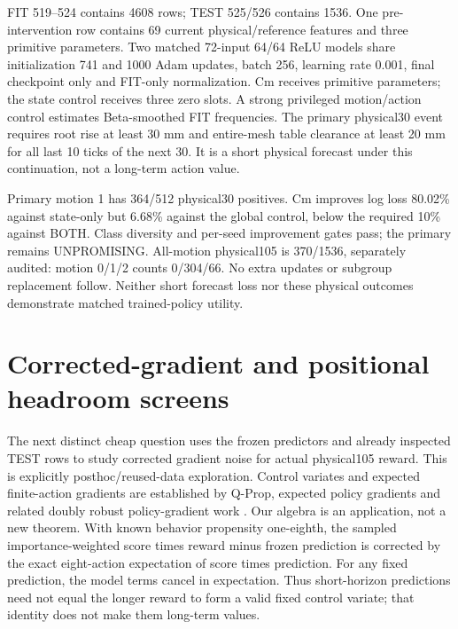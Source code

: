 \documentclass[10pt]{article}
\begin{document}
FIT 519--524 contains 4608 rows; TEST 525/526 contains 1536. One pre-intervention row
contains 69 current physical/reference features and three primitive parameters.
Two matched 72-input 64/64 ReLU models share initialization 741 and 1000 Adam updates,
batch 256, learning rate 0.001, final checkpoint only and FIT-only normalization.
Cm receives primitive parameters; the state control receives three zero slots.
A strong privileged motion/action control estimates Beta-smoothed FIT frequencies.
The primary physical30 event requires root rise at least 30 mm and entire-mesh
table clearance at least 20 mm for all last 10 ticks of the next 30. It is a short
physical forecast under this continuation, not a long-term action value.

\begin{table}[h]
\centering

\caption{Frozen forecast log losses; smaller is better. Motion 1 is preselected. All-motion results are secondary and do not replace the primary gate.}
\end{table}

Primary motion 1 has 364/512 physical30 positives. Cm improves log loss 80.02\% against
state-only but 6.68\% against the global control, below the required 10\% against BOTH.
Class diversity and per-seed improvement gates pass; the primary remains UNPROMISING.
All-motion physical105 is 370/1536, separately audited: motion 0/1/2 counts 0/304/66.
No extra updates or subgroup replacement follow. Neither short forecast loss nor
these physical outcomes demonstrate matched trained-policy utility.

\section{Corrected-gradient and positional headroom screens}
The next distinct cheap question uses the frozen predictors and already inspected
TEST rows to study corrected gradient noise for actual physical105 reward.
This is explicitly posthoc/reused-data exploration. Control variates and expected
finite-action gradients are established by Q-Prop, expected policy gradients and
related doubly robust policy-gradient work \cite{gu2017,ciosek2020,huang2020}.
Our algebra is an application, not a new theorem. With known behavior propensity
one-eighth, the sampled importance-weighted score times reward minus frozen
prediction is corrected by the exact eight-action expectation of score times
prediction. For any fixed prediction, the model terms cancel in expectation.
Thus short-horizon predictions need not equal the longer reward to form a valid
fixed control variate; that identity does not make them long-term values.
\end{document}
